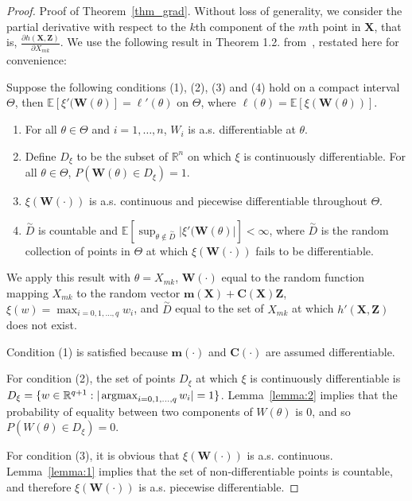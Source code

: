 \documentclass[paper=letter]{scrartcl}
\newcommand{\argmax}{\operatornamewithlimits{argmax}}
\newcommand{\E}{\mathbb{E}}
\begin{document}
\begin{proof}{Proof of Theorem~\ref{thm_grad}.} 
Without loss of generality, we consider the partial derivative with respect to the $k$th component of the $m$th point in $\bm{X}$, that is, $\frac{\partial h(\bm{X}, \bm{Z})}{\partial X_{mk}}$. We use the following result in Theorem 1.2. from~\cite{Glasserman1991}, restated here for convenience:

Suppose the following conditions (1), (2), (3) and (4) hold on a compact interval $\Theta$, then $\E\left[ \xi'(\bm{W}(\theta)\right] = \ell'(\theta)$ on $\Theta$, where $\ell(\theta) = \E\left[\xi(\bm{W}(\theta))\right]$.
\begin{enumerate}
\item[(1)]
For all $\theta \in \Theta$ and $i=1,\ldots,n$, $W_i$ is a.s. differentiable at $\theta$.
\item[(2)]
Define $D_{\xi}$ to be the subset of $\mathbb{R}^n$ on which $\xi$ is continuously differentiable. For all $\theta \in \Theta$, $P\left(\bm{W}(\theta) \in D_{\xi}\right)=1$.
\item[(3)]
$\xi\left(\bm{W}(\cdot)\right)$ is a.s. continuous and piecewise differentiable throughout $\Theta$.
\item[(4)]
$\overset{\sim}{D}$ is countable and 
$\E\left[ \sup_{\theta \notin \overset{\sim}{D}} |\xi'(\bm{W}(\theta)|\right] < \infty$, where $\overset{\sim}{D}$ is the random collection of points in $\Theta$ at which $\xi(\bm{W}(\cdot))$ fails to be differentiable. 
\end{enumerate}

We apply this result with $\theta=X_{mk}$,
$\bm{W}(\cdot)$ equal to the random function mapping $X_{mk}$ to the random vector $\bm{m}(\bm{X}) + \bm{C}(\bm{X})\bm{Z}$,
$\xi(w) = \max_{i=0,1,\ldots,q} w_i$,
and $\overset{\sim}{D}$ equal to the set of $X_{mk}$ at which $h'(\bm{X}, \bm{Z})$ does not exist.

Condition (1) is satisfied because $\bm{m}(\cdot)$ and $\bm{C}(\cdot)$ are assumed differentiable.

For condition (2), the set of points $D_\xi$
at which $\xi$ is continuously differentiable is 
$D_\xi = \{ w \in \mathbb{R}^{q+1} : | \argmax_{i=0,1,\ldots,q} w_i| = 1\}$. Lemma~\ref{lemma:2} implies that the probability of equality between two components of $W(\theta)$ is 0, and so $P(W(\theta) \in D_\xi) = 0$.

For condition (3), it is obvious that $\xi\left(\bm{W}(\cdot)\right)$ is a.s. continuous. Lemma~\ref{lemma:1} implies that the set of non-differentiable points is countable, and therefore $\xi\left(\bm{W}(\cdot)\right)$ is a.s. piecewise differentiable.


\end{proof}
\end{document}
